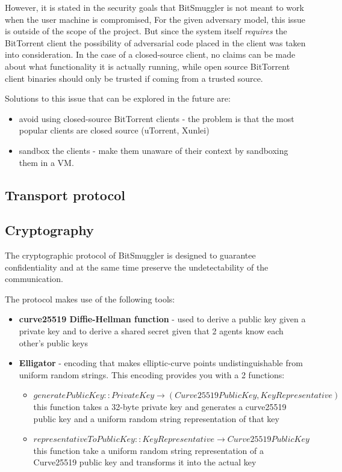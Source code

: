 \documentclass[11pt]{article} %
\newcommand{\projectName}{BitSmuggler }
\begin{document}
However, it is stated in the security goals that \projectName is not meant to work when the user machine is compromised, For the given adversary model, this issue is outside of the scope of the project. But since the system itself \textit{requires} the BitTorrent client  the possibility of adversarial code placed in the client was taken into consideration. In the case of a closed-source client, no claims can be made about what functionality it is actually running, while open source BitTorrent client binaries should only be trusted if coming from a trusted source.

Solutions to this issue that can be explored in the future are:
\begin{itemize}
\item avoid using closed-source BitTorrent clients - the problem is that the most popular clients are closed source (uTorrent, Xunlei)
\item sandbox the clients - make them unaware of their context by sandboxing them in a VM.
\end{itemize}


\subsection{Transport protocol}


\subsection{Cryptography}
\label{subsec:crypto}
\label{subsec:cryptoProtocol}
The cryptographic protocol of \projectName is designed to guarantee confidentiality and at the same time preserve the undetectability of the communication.

The protocol makes use of the following tools:
\begin{itemize}
\item \textbf{curve25519 Diffie-Hellman function} - used to derive a public key given a private key and to derive a shared secret given that 2 agents know each other's public keys
\item \textbf{Elligator} - encoding that makes elliptic-curve points undistinguishable from uniform random strings. This encoding provides you with a 2 functions: 
\begin{itemize}
\item \( generatePublicKey :: PrivateKey \rightarrow (Curve25519PublicKey, KeyRepresentative) \)
this function takes a 32-byte private key and generates a curve25519 public key and a uniform random string representation of that key
\item \(representativeToPublicKey :: KeyRepresentative \rightarrow Curve25519PublicKey  \)
this function take a uniform random string representation of a Curve25519 public key and transforms it into the actual key
\end{itemize}
\end{itemize}
\end{document}
